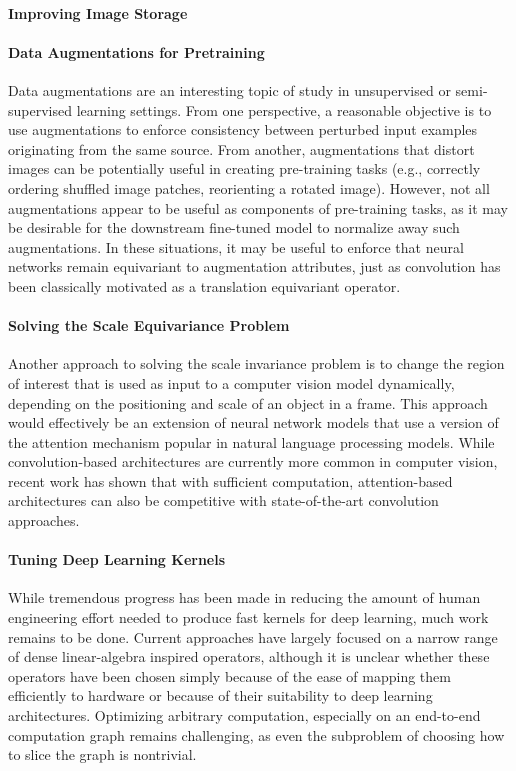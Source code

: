 \paragraph{Improving Image Storage}


\paragraph{Data Augmentations for Pretraining}
Data augmentations are an interesting topic of study in unsupervised or semi-supervised learning settings.
From one perspective, a reasonable objective is to use augmentations to enforce consistency between perturbed input examples originating from the same source.
From another, augmentations that distort images can be potentially useful in creating pre-training tasks (e.g., correctly ordering shuffled image patches, reorienting a rotated image).
However, not all augmentations appear to be useful as components of pre-training tasks, as it may be desirable for the downstream fine-tuned model to normalize away such augmentations.
In these situations, it may be useful to enforce that neural networks remain equivariant to augmentation attributes, just as convolution has been classically motivated as a translation equivariant operator.


\paragraph{Solving the Scale Equivariance Problem}
Another approach to solving the scale invariance problem is to change the region of interest that is used as input to a computer vision model dynamically, depending on the positioning and scale of an object in a frame.
This approach would effectively be an extension of neural network models that use a version of the attention mechanism popular in natural language processing models.
While convolution-based architectures are currently more common in computer vision, recent work has shown that with sufficient computation, attention-based architectures can also be competitive with state-of-the-art convolution approaches.


\paragraph{Tuning Deep Learning Kernels}
While tremendous progress has been made in reducing the amount of human engineering effort needed to produce fast kernels for deep learning, much work remains to be done.
Current approaches have largely focused on a narrow range of dense linear-algebra inspired operators, although it is unclear whether these operators have been chosen simply because of the ease of mapping them efficiently to hardware or because of their suitability to deep learning architectures.
Optimizing arbitrary computation, especially on an end-to-end computation graph remains challenging, as even the subproblem of choosing how to slice the graph is nontrivial.

